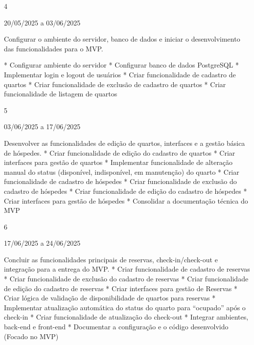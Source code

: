 4
	



20/05/2025 a 03/06/2025
	

Configurar o ambiente do servidor, banco de dados e iniciar o desenvolvimento das funcionalidades para o MVP.
	

* Configurar ambiente do servidor
* Configurar banco de dados PostgreSQL
* Implementar login e logout de usuários
* Criar funcionalidade de cadastro de quartos
* Criar funcionalidade de exclusão de cadastro de quartos
* Criar funcionalidade de listagem de quartos
	







5
	



03/06/2025 a 17/06/2025
	



Desenvolver as funcionalidades de edição de quartos, interfaces e a gestão básica de hóspedes.
	* Criar funcionalidade de edição do cadastro de quartos
* Criar interfaces para gestão de quartos
* Implementar funcionalidade de alteração manual do status (disponível, indisponível, em manutenção) do quarto
* Criar funcionalidade de cadastro de hóspedes
* Criar funcionalidade de exclusão do cadastro de hóspedes
* Criar funcionalidade de edição do cadastro de hóspedes
* Criar interfaces para gestão de hóspedes
* Consolidar a documentação técnica do MVP


	





















6
	









17/06/2025 a 24/06/2025
	











Concluir as funcionalidades principais de reservas, check-in/check-out e integração para a entrega do MVP.
	* Criar funcionalidade de cadastro de reservas
* Criar funcionalidade de exclusão do cadastro de reservas
* Criar funcionalidade de edição do cadastro de reservas
* Criar interfaces para gestão de Reservas
* Criar lógica de validação de disponibilidade de quartos para reservas
* Implementar atualização automática do status do quarto para “ocupado” após o check-in
* Criar funcionalidade de atualização do check-out
* Integrar ambientes, back-end e front-end
* Documentar a configuração e o código desenvolvido (Focado no MVP)
	








